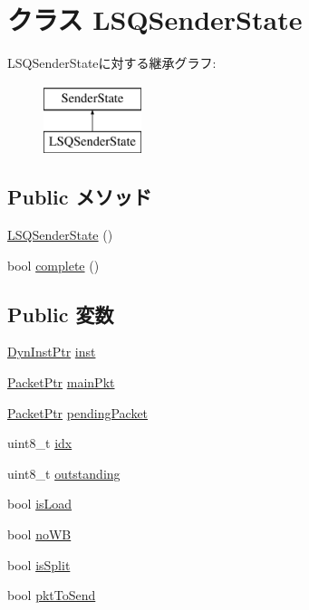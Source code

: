 \hypertarget{classLSQUnit_1_1LSQSenderState}{
\section{クラス LSQSenderState}
\label{classLSQUnit_1_1LSQSenderState}
}
LSQSenderStateに対する継承グラフ:\begin{figure}[H]
\begin{center}
\leavevmode
\includegraphics[height=2cm]{classLSQUnit_1_1LSQSenderState}
\end{center}
\end{figure}
\subsection*{Public メソッド}
\begin{DoxyCompactItemize}
\item 
\hyperlink{classLSQUnit_1_1LSQSenderState_a0f4caf0593be7a2d809d7335984820d2}{LSQSenderState} ()
\item 
bool \hyperlink{classLSQUnit_1_1LSQSenderState_a052a3064081f9c45c97b467fba70b73b}{complete} ()
\end{DoxyCompactItemize}
\subsection*{Public 変数}
\begin{DoxyCompactItemize}
\item 
\hyperlink{classLSQUnit_a028ce10889c5f6450239d9e9a7347976}{DynInstPtr} \hyperlink{classLSQUnit_1_1LSQSenderState_af5d4fb974eeb4507d4c837d365d0cefc}{inst}
\item 
\hyperlink{classPacket}{PacketPtr} \hyperlink{classLSQUnit_1_1LSQSenderState_aef239ed2096a497e3f46123fb622a6ce}{mainPkt}
\item 
\hyperlink{classPacket}{PacketPtr} \hyperlink{classLSQUnit_1_1LSQSenderState_a25b58d4e62313febd9739ff9d1499e9a}{pendingPacket}
\item 
uint8\_\-t \hyperlink{classLSQUnit_1_1LSQSenderState_a266732d9c228f9bac150e7554734d112}{idx}
\item 
uint8\_\-t \hyperlink{classLSQUnit_1_1LSQSenderState_a9acbf52ad6e4c142c8b125cb53c13226}{outstanding}
\item 
bool \hyperlink{classLSQUnit_1_1LSQSenderState_aaa492a23dd827a27baf0e8abcf09e391}{isLoad}
\item 
bool \hyperlink{classLSQUnit_1_1LSQSenderState_aee33f1eef98f14502c88334f70e6c03d}{noWB}
\item 
bool \hyperlink{classLSQUnit_1_1LSQSenderState_afd8e5886f3bd5827ade12fcaf8ea2a47}{isSplit}
\item 
bool \hyperlink{classLSQUnit_1_1LSQSenderState_aaa537e4674fbcde1b08a2e0d3f5f7f41}{pktToSend}
\end{DoxyCompactItemize}



